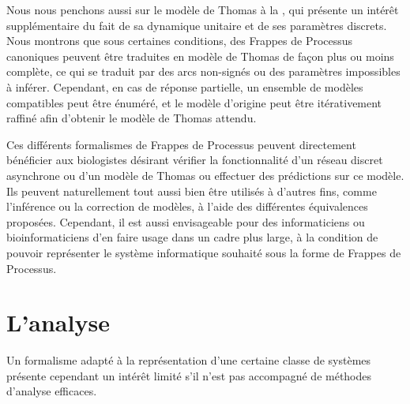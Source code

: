 Nous nous penchons aussi sur le modèle de Thomas à la ,
qui présente un intérêt supplémentaire du fait de sa dynamique unitaire
et de ses paramètres discrets.
Nous montrons que sous certaines conditions, des Frappes de Processus canoniques
peuvent être traduites en modèle de Thomas de façon plus ou moins complète,
ce qui se traduit par des arcs non-signés ou des paramètres impossibles à inférer.
Cependant, en cas de réponse partielle,
un ensemble de modèles compatibles peut être énuméré,
et le modèle d'origine peut être itérativement raffiné afin d'obtenir
le modèle de Thomas attendu.


\myskip

Ces différents formalismes de Frappes de Processus
peuvent directement bénéficier aux biologistes désirant
vérifier la fonctionnalité d'un réseau discret asynchrone ou d'un modèle de Thomas
ou effectuer des prédictions sur ce modèle.
Ils peuvent naturellement tout aussi bien être utilisés à d'autres fins,
comme l'inférence ou la correction de modèles, à l'aide des différentes équivalences proposées.
Cependant, il est aussi envisageable pour des informaticiens ou bioinformaticiens
d'en faire usage dans un cadre
plus large, à la condition de pouvoir représenter le système informatique souhaité
sous la forme de Frappes de Processus.



\section{L'analyse}

Un formalisme adapté à la représentation d'une certaine classe de systèmes présente cependant
un intérêt limité s'il n'est pas accompagné de méthodes d'analyse efficaces.

